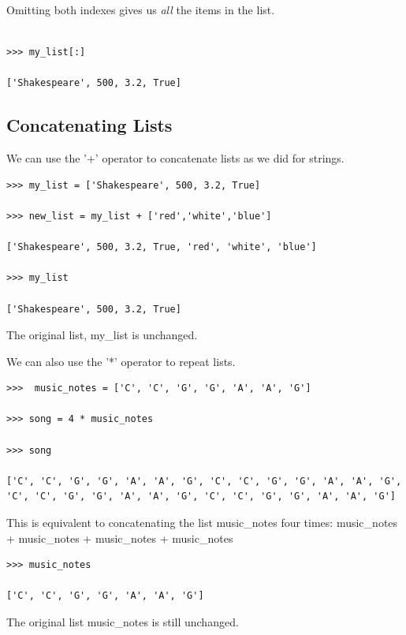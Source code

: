 \documentclass{article}
\begin{document}
Omitting both indexes gives us \textit{all} the items in the list.

\begin{lstlisting}

>>> my_list[:]

['Shakespeare', 500, 3.2, True]

\end{lstlisting}

\subsection{Concatenating Lists}

We can use the '+' operator to concatenate lists as we did for strings.

\begin{lstlisting}
>>> my_list = ['Shakespeare', 500, 3.2, True]

>>> new_list = my_list + ['red','white','blue']

['Shakespeare', 500, 3.2, True, 'red', 'white', 'blue']

>>> my_list

['Shakespeare', 500, 3.2, True]

\end{lstlisting}

The original list, my{\_}list  is unchanged.

We can also use the '*' operator to repeat lists.

\begin{lstlisting}
>>>  music_notes = ['C', 'C', 'G', 'G', 'A', 'A', 'G']

>>> song = 4 * music_notes

>>> song

['C', 'C', 'G', 'G', 'A', 'A', 'G', 'C', 'C', 'G', 'G', 'A', 'A', 'G', 'C', 'C', 'G', 'G', 'A', 'A', 'G', 'C', 'C', 'G', 'G', 'A', 'A', 'G']

\end{lstlisting}

This is equivalent to concatenating the list music{\_}notes four times: music{\_}notes + music{\_}notes + music{\_}notes + music{\_}notes

\begin{lstlisting}
>>> music_notes

['C', 'C', 'G', 'G', 'A', 'A', 'G']

\end{lstlisting}

The original list music{\_}notes is still unchanged. 
\end{document}
